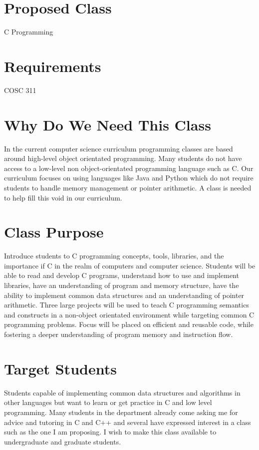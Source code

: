 \documentclass[a4paper,12pt]{report}
\begin{document}
\section*{Proposed Class}
C Programming

\section*{Requirements}
COSC 311

\section*{Why Do We Need This Class}
In the current computer science curriculum programming classes are based around high-level object orientated programming.  Many students do not have access to a low-level non object-orientated programming language such as C.  Our curriculum focuses on using languages like Java and Python which do not require students to handle memory management or pointer arithmetic.  A class is needed to help fill this void in our curriculum.

\section*{Class Purpose}
Introduce students to C programming concepts, tools, libraries, and the importance if C in the realm of computers and computer science.  Students will be able to read and develop C programs, understand how to use and implement libraries, have an understanding of program and memory structure, have the ability to implement common data structures and an understanding of pointer arithmetic.  Three large projects will be used to teach C programming semantics and constructs in a non-object orientated environment while targeting common C programming problems.  Focus will be placed on efficient and reusable code, while fostering a deeper understanding of program memory and instruction flow.  

\section*{Target Students}
Students capable of implementing common data structures and algorithms in other languages but want to learn or get practice in C and low level programming.  Many students in the department already come asking me for advice and tutoring in C and C++ and several have expressed interest in a class such as the one I am proposing.  I wish to make this class available to undergraduate and graduate students.
\end{document}
